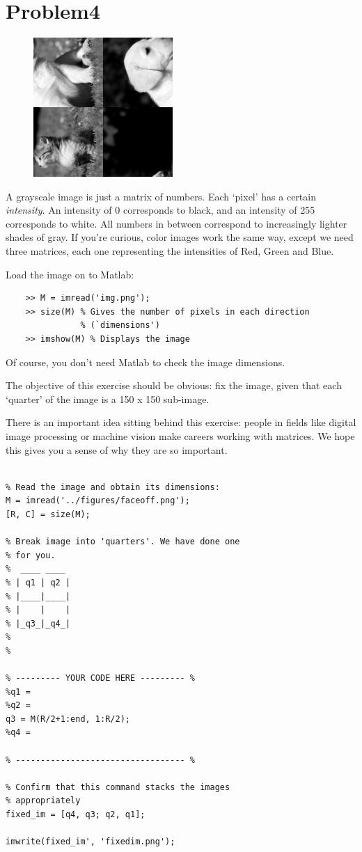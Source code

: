 \documentclass{article}
\begin{document}
\section*{Problem4}

\begin{figure}[h]
\begin{center}
\includegraphics[height=150pt]{img.png}
\end{center}
\end{figure}

A grayscale image is just a matrix of numbers. Each `pixel' has
a certain \emph{intensity}. An intensity of 0 corresponds to black,
and an intensity of 255 corresponds to white. All numbers in between
correspond to increasingly lighter shades of gray. If you're curious,
color images work the same way, except we need three matrices, each
one representing the intensities of Red, Green and Blue.

Load the image on to Matlab:

\begin{verbatim}
    >> M = imread('img.png');
    >> size(M) % Gives the number of pixels in each direction 
               % (`dimensions')
    >> imshow(M) % Displays the image
\end{verbatim}

Of course, you don't need Matlab to check the image dimensions.

The objective of this exercise should be obvious: fix the image, given that
each `quarter' of the image is a 150 x 150 sub-image.

There is an important idea sitting behind this exercise: people in
fields like digital image processing or machine vision make careers
working with matrices. We hope this gives you a sense of why they are
so important.


\begin{verbatim}

% Read the image and obtain its dimensions:
M = imread('../figures/faceoff.png');
[R, C] = size(M);

% Break image into 'quarters'. We have done one
% for you.
%  ____ ____
% | q1 | q2 |
% |____|____|
% |    |    |
% |_q3_|_q4_|
%
%

% --------- YOUR CODE HERE --------- %
%q1 = 
%q2 = 
q3 = M(R/2+1:end, 1:R/2);
%q4 = 

% ---------------------------------- %

% Confirm that this command stacks the images
% appropriately
fixed_im = [q4, q3; q2, q1];

imwrite(fixed_im', 'fixedim.png');

\end{verbatim}
\end{document}
